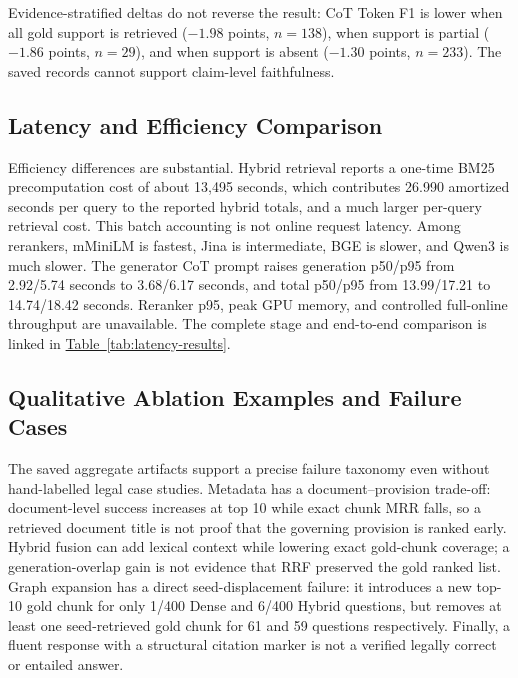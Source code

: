 Evidence-stratified deltas do not reverse the result: CoT Token F1 is lower
when all gold support is retrieved ($-1.98$ points, $n=138$), when support is
partial ($-1.86$ points, $n=29$), and when support is absent ($-1.30$ points,
$n=233$). The saved records cannot support claim-level faithfulness.

\subsection{Latency and Efficiency Comparison}
\label{sec:ablation-efficiency}

Efficiency differences are substantial. Hybrid retrieval reports a one-time
BM25 precomputation cost of about 13,495 seconds, which contributes 26.990
amortized seconds per query to the reported hybrid totals, and a much larger
per-query retrieval cost. This batch accounting is not online request latency.
Among rerankers, mMiniLM is fastest, Jina is intermediate,
BGE is slower, and Qwen3 is much slower. The generator CoT prompt raises
generation p50/p95 from 2.92/5.74 seconds to 3.68/6.17 seconds, and total
p50/p95 from 13.99/17.21 to 14.74/18.42 seconds. Reranker p95, peak GPU
memory, and controlled full-online throughput are unavailable. The complete
stage and end-to-end comparison is linked in
\hyperref[tab:latency-results]{Table~\ref*{tab:latency-results}}.

\subsection{Qualitative Ablation Examples and Failure Cases}
\label{sec:qualitative-ablation}

The saved aggregate artifacts support a precise failure taxonomy even without
hand-labelled legal case studies. Metadata has a document--provision trade-off:
document-level success increases at top 10 while exact chunk MRR falls, so a
retrieved document title is not proof that the governing provision is ranked
early. Hybrid fusion can add lexical context while lowering exact gold-chunk
coverage; a generation-overlap gain is not evidence that RRF preserved the
gold ranked list. Graph expansion has a direct seed-displacement failure: it
introduces a new top-10 gold chunk for only 1/400 Dense and 6/400 Hybrid
questions, but removes at least one seed-retrieved gold chunk for 61 and 59
questions respectively. Finally, a fluent response with a structural citation
marker is not a verified legally correct or entailed answer.

